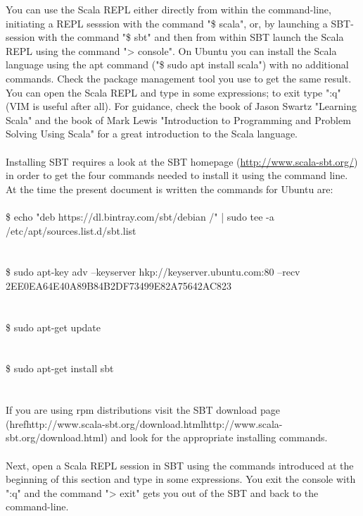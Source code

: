 \documentclass {article}
\begin{document}
You can use the Scala REPL either directly from within the command-line, initiating a REPL sesssion with the command "\$ scala", or, by launching a SBT-session with the command "\$ sbt" and then from within SBT launch the Scala REPL using the command "> console".
 On Ubuntu you can install the Scala language using the apt command ("\$ sudo apt install scala") with no additional commands.
 Check the package management tool you use to get the same result. You can open the Scala REPL and type in some expressions; to exit type ":q" (VIM is useful after all). 
For guidance, check the book of Jason Swartz "Learning Scala" \cite{swartz_learning_2015} and the book of Mark Lewis "Introduction to Programming and Problem Solving Using Scala" \cite{lewis_introduction_2017}for a great introduction to the Scala language. 
\\
\\
Installing SBT requires a look at the SBT homepage (\href{http://www.scala-sbt.org/}{http://www.scala-sbt.org/}) in order to get the four commands needed to install it using the command line.
 At the time the present document is written the commands for Ubuntu  are:
\\
\\
\$ echo "deb https://dl.bintray.com/sbt/debian /" | sudo tee -a /etc/apt/sources.list.d/sbt.list\\
\\
\\
\$ sudo apt-key adv --keyserver hkp://keyserver.ubuntu.com:80 --recv 2EE0EA64E40A89B84B2DF73499E82A75642AC823\\
\\
\\
\$ sudo apt-get update\\
\\
\\
\$ sudo apt-get install sbt\\
\\
\\
If you are using rpm distributions visit the SBT download page (href{http://www.scala-sbt.org/download.html}{http://www.scala-sbt.org/download.html}) and look for the appropriate installing commands. 
\\
\\
Next, open a Scala REPL session in SBT using the commands introduced at the beginning of this section and type in some expressions.
 You exit the console with ":q" and the command "> exit" gets you out of the SBT and back to the command-line.
\end{document}
